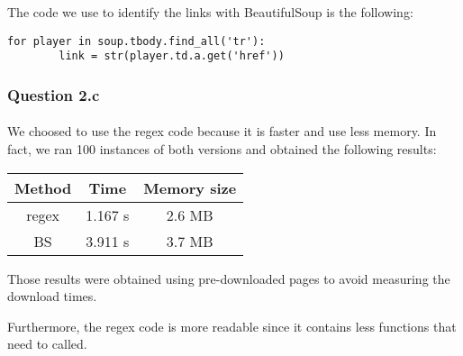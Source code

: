 The code we use to identify the links with BeautifulSoup is the following:
\begin{verbatim}
for player in soup.tbody.find_all('tr'):
        link = str(player.td.a.get('href'))
\end{verbatim}

\subsubsection{Question 2.c}
\label{subsubsec:312c}
\paragraph{} We choosed to use the regex code because it is faster and use less memory. In fact, we ran 100 instances of both versions and obtained the following results:
\begin{center}
	\begin{tabular}{| c | c | c |}
	\hline
	Method & Time & Memory size \\ \hline
	regex 	& 1.167 s & 2.6 MB \\ \hline
	BS & 3.911 s & 3.7 MB \\
	\hline
	\end{tabular}
\end{center}
Those results were obtained using pre-downloaded pages to avoid measuring the download times.


Furthermore, the regex code is more readable since it contains less functions that need to called.
